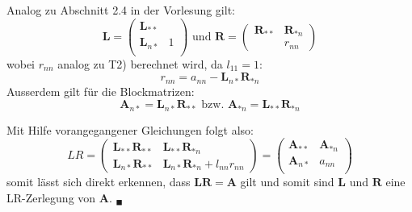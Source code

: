 \documentclass[11pt]{article}
\theoremstyle{plain}
\theoremstyle{definition}
\let\mbb\boldsymbol
\renewcommand\boldsymbol{\mbb}
\renewcommand{\a}{\"{a}}
\renewcommand{\u}{\"{u}}
\begin{document}
Analog zu Abschnitt 2.4 in der Vorlesung gilt:
\begin{equation}
\mbb{L} = 
\begin{pmatrix}
\mbb{L}_{**} & 		\\
\mbb{L}_{n*} & 1 \\
\end{pmatrix}
\text{ und }
\mbb{R} = 
\begin{pmatrix}
\mbb{R}_{**} & \mbb{R}_{*n} \\
& r_{nn}
\end{pmatrix}
\end{equation}
wobei $r_{nn}$ analog zu T2) berechnet wird, da $l_{11}=1$:
\begin{equation}
r_{nn} = a_{nn} - \mbb{L}_{n*}\mbb{R}_{*n}
\end{equation}
Ausserdem gilt f\u r die Blockmatrizen:
\begin{equation}
\mbb{A}_{n*}=\mbb{L}_{n*}\mbb{R}_{**}
\text{ bzw. } 
\mbb{A}_{*n}=\mbb{L}_{**}\mbb{R}_{*n}
\end{equation}


Mit Hilfe vorangegangener Gleichungen folgt also:
\begin{equation}
LR = 
\begin{pmatrix}
\mbb{L}_{**}\mbb{R}_{**} & \mbb{L}_{**}\mbb{R}_{*n} \\
\mbb{L}_{n*}\mbb{R}_{**} & \mbb{L}_{n*}\mbb{R}_{*n}+l_{nn}r_{nn}
\end{pmatrix}
=
\begin{pmatrix}
\mbb{A}_{**} & \mbb{A}_{*n} \\
\mbb{A}_{n*} & a_{nn}   \\
\end{pmatrix}
\end{equation}
somit l\a sst sich direkt erkennen, dass $\mbb{L}\mbb{R}=\mbb{A}$ gilt und somit sind $\mbb{L}$ und $\mbb{R}$ eine LR-Zerlegung von $\mbb{A}$. $_\blacksquare$
 
 
 
 
 
 
 
 
 
 
 
 
 
 
 
 
 
 
 
\end{document}

